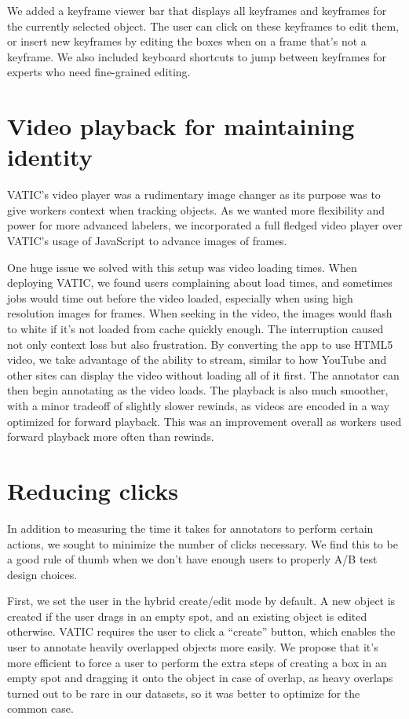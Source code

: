 We added a keyframe viewer bar that displays all keyframes and keyframes for the currently selected object.
The user can click on these keyframes to edit them, or insert new keyframes by editing the boxes when on a frame that's not a keyframe.
We also included keyboard shortcuts to jump between keyframes for experts who need fine-grained editing.

\section{Video playback for maintaining identity}

VATIC's video player was a rudimentary image changer as its purpose was to give workers context when tracking objects.
As we wanted more flexibility and power for more advanced labelers, we incorporated a full fledged video player over VATIC's usage of JavaScript to advance images of frames.

One huge issue we solved with this setup was video loading times.
When deploying VATIC, we found users complaining about load times, and sometimes jobs would time out before the video loaded, especially when using high resolution images for frames.
When seeking in the video, the images would flash to white if it's not loaded from cache quickly enough.
The interruption caused not only context loss but also frustration.
By converting the app to use HTML5 video, we take advantage of the ability to stream, similar to how YouTube and other sites can display the video without loading all of it first.
The annotator can then begin annotating as the video loads.
The playback is also much smoother, with a minor tradeoff of slightly slower rewinds, as videos are encoded in a way optimized for forward playback.
This was an improvement overall as workers used forward playback more often than rewinds.

\section{Reducing clicks}

In addition to measuring the time it takes for annotators to perform certain actions, we sought to minimize the number of clicks necessary.
We find this to be a good rule of thumb when we don't have enough users to properly A/B test design choices.

First, we set the user in the hybrid create/edit mode by default.
A new object is created if the user drags in an empty spot, and an existing object is edited otherwise.
VATIC requires the user to click a ``create'' button, which enables the user to annotate heavily overlapped objects more easily.
We propose that it's more efficient to force a user to perform the extra steps of creating a box in an empty spot and dragging it onto the object in case of overlap,
as heavy overlaps turned out to be rare in our datasets, so it was better to optimize for the common case.

